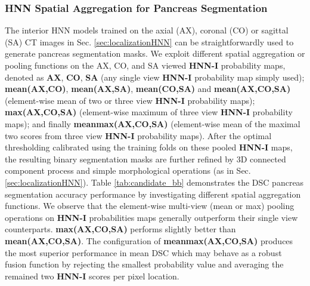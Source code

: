 \documentclass[journal]{IEEEtran}
\begin{document}
\subsubsection{HNN Spatial Aggregation for Pancreas Segmentation}
The interior HNN models trained on the axial (AX), coronal (CO) or sagittal (SA) CT images in Sec. \ref{sec:localizationHNN} can be straightforwardly used to generate pancreas segmentation masks. We exploit different spatial aggregation or pooling functions on the AX, CO, and SA viewed \textbf{HNN-I} probability maps, denoted as \textbf{AX}, \textbf{CO}, \textbf{SA} (any single view \textbf{HNN-I} probability map simply used); \textbf{mean(AX,CO)}, \textbf{mean(AX,SA)}, \textbf{mean(CO,SA)} and \textbf{mean(AX,CO,SA)} (element-wise mean of two or three view \textbf{HNN-I} probability maps); \textbf{max(AX,CO,SA)} (element-wise maximum of three view \textbf{HNN-I} probability maps); and finally \textbf{meanmax(AX,CO,SA)} (element-wise mean of the maximal two scores from three view \textbf{HNN-I} probability maps). After the optimal thresholding calibrated using the training folds on these pooled \textbf{HNN-I} maps, the resulting binary segmentation masks are further refined by 3D connected component process and simple morphological operations (as in Sec. \ref{sec:localizationHNN}). Table \ref{tab:candidate_bb} demonstrates the DSC pancreas segmentation accuracy performance by investigating different spatial aggregation functions. We observe that the element-wise multi-view (mean or max) pooling operations on \textbf{HNN-I} probabilities maps generally outperform their single view counterparts. \textbf{max(AX,CO,SA)} performs slightly better than \textbf{mean(AX,CO,SA)}. The configuration of \textbf{meanmax(AX,CO,SA)} produces the most superior performance in mean DSC which may behave as a robust fusion function by rejecting the smallest probability value and averaging the remained two \textbf{HNN-I} scores per pixel location. 
\end{document}
